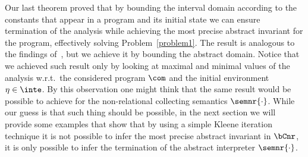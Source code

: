 
Our last theorem proved that by bounding the interval domain according
to the constants that appear in a program and its initial state we can
ensure termination of the analysis while achieving the most precise
abstract invariant for the program, effectively solving
Problem~\ref{problem1}. The result is analogous to the findings
of~\cite{Gawlitza2009}, but we achieve it by bounding the abstract
domain. Notice that we achieved such result only by looking at maximal
and minimal values of the analysis w.r.t.\ the considered program
\(\com\) and the initial environment \(\eta \in \inte\). By this
observation one might think that the same result would be possible to
achieve for the non-relational collecting semantics
\(\semnr{\cdot}\). While our guess is that such thing should be
possible, in the next section we will provide some examples that show
that by using a simple Kleene iteration technique it is not possible
to infer the most precise abstract invariant in \(\bCnr\), it is only
possible to infer the termination of the abstract interpreter
\(\semnr{\cdot}\).

